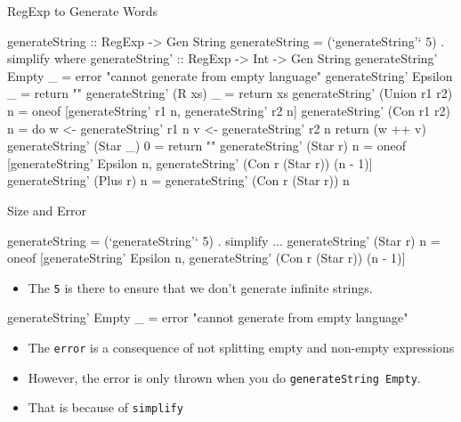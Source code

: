 \begin{frame}[fragile]{RegExp to Generate Words}
	\begin{code}
generateString :: RegExp -> Gen String
generateString = (`generateString'` 5) . simplify
	where generateString' :: RegExp -> Int -> Gen String
	generateString' Empty _ = error "cannot generate from empty language" 
	generateString' Epsilon _ = return ""
	generateString' (R xs) _ = return xs
	generateString' (Union r1 r2) n = oneof [generateString' r1 n, generateString' r2 n]
	generateString' (Con r1 r2) n = do
		w <- generateString' r1 n
		v <- generateString' r2 n
		return (w ++ v)
	generateString' (Star _) 0 = return ""    
	generateString' (Star r) n = oneof [generateString' Epsilon n, generateString' (Con r (Star r)) (n - 1)]
	generateString' (Plus r) n = generateString' (Con r (Star r)) n
	\end{code}
\end{frame}
\begin{frame}[fragile]{Size and Error}
	\begin{code}
generateString = (`generateString'` 5) . simplify
...
generateString' (Star r) n = oneof [generateString' Epsilon n,  		generateString' (Con r (Star r)) (n - 1)]
	\end{code}
\begin{itemize}
	\item The \texttt{5} is there to ensure that we don't generate infinite strings.
\end{itemize}	

\bigskip

\pause

	\begin{code}
generateString' Empty _ = error "cannot generate from empty language"
	\end{code}
	\begin{itemize}
		\item The \texttt{error} is a consequence of not splitting empty and non-empty expressions	
		\item However, the error is only thrown when you do \texttt{generateString Empty}.
		\item That is because of \texttt{simplify}
	\end{itemize}
\end{frame}
